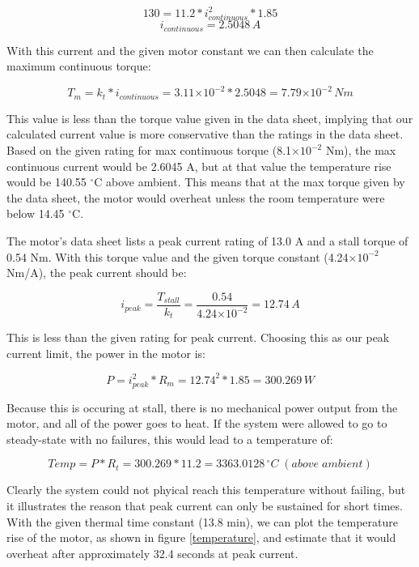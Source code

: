 \documentclass{article}
\theoremstyle{plain}
\theoremstyle{definition}
\theoremstyle{remark}
\providecommand{\e}[1]{\ensuremath{\times 10^{#1}}}
\begin{document}
$$130 = 11.2*i_{continuous}^2*1.85$$
$$i_{continuous} = 2.5048 \,A$$

With this current and the given motor constant we can then calculate the maximum continuous torque:

$$T_{m} = k_{t}*i_{continuous} = 3.11\e{-2}*2.5048 = 7.79\e{-2}\, Nm$$

This value is less than the torque value given in the data sheet, implying that our calculated current value is more conservative than the ratings in the data sheet. Based on the given rating for max continuous torque (8.1$\e{-2}$ Nm), the max continuous current would be 2.6045 A, but at that value the temperature rise would be 140.55 $^\circ$C above ambient. This means that at the max torque given by the data sheet, the motor would overheat unless the room temperature were below 14.45 $^\circ$C. 

The motor's data sheet lists a peak current rating of 13.0 A and a stall torque of 0.54 Nm. With this torque value and the given torque constant (4.24$\e{-2}$ Nm/A), the peak current should be:


$$i_{peak} = \frac{T_{stall}}{k_{t}} = \frac{0.54}{4.24\e{-2}} = 12.74 \,A$$

This is less than the given rating for peak current. Choosing this as our peak current limit, the power in the motor is:


$$P = i_{peak}^2 * R_{m} = 12.74^2 * 1.85 = 300.269 \,W$$

Because this is occuring at stall, there is no mechanical power output from the motor, and all of the power goes to heat. If the system were allowed to go to steady-state with no failures, this would lead to a temperature of:

$$Temp = P * R_{t} = 300.269 * 11.2 = 3363.0128  \,{^\circ}C\;(above \;ambient)$$ 

Clearly the system could not phyical reach this temperature without failing, but it illustrates the reason that peak current can only be sustained for short times. With the given thermal time constant (13.8 min), we can plot the temperature rise of the motor, as shown in figure \ref{temperature}, and estimate that it would overheat after approximately 32.4 seconds at peak current. 
\end{document}
